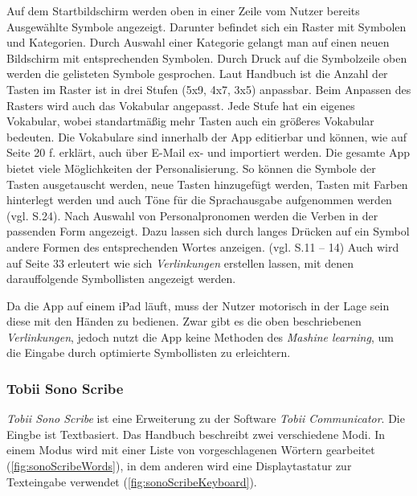             Auf dem Startbildschirm werden oben in einer Zeile vom Nutzer bereits Ausgewählte Symbole angezeigt. Darunter befindet sich ein Raster mit Symbolen und Kategorien. Durch Auswahl einer Kategorie gelangt man auf einen neuen Bildschirm mit entsprechenden Symbolen.
            Durch Druck auf die Symbolzeile oben werden die gelisteten Symbole gesprochen. 
            Laut Handbuch \parencite[S. 7 ff]{cidar:metaTalkManual} ist die Anzahl der Tasten im Raster ist in drei Stufen (5x9, 4x7, 3x5) anpassbar. Beim Anpassen des Rasters wird auch das Vokabular angepasst. Jede Stufe hat ein eigenes Vokabular, wobei standartmäßig mehr Tasten auch ein größeres Vokabular bedeuten. Die Vokabulare sind innerhalb der App editierbar und können, wie auf Seite 20 f. erklärt, auch über E-Mail ex- und importiert werden. Die gesamte App bietet viele Möglichkeiten der Personalisierung. So können die Symbole der Tasten ausgetauscht werden, neue Tasten hinzugefügt werden, Tasten mit Farben hinterlegt werden und auch Töne für die Sprachausgabe aufgenommen werden (vgl. S.24). Nach Auswahl von Personalpronomen werden die Verben in der passenden Form angezeigt. Dazu lassen sich durch langes Drücken auf ein Symbol andere Formen des entsprechenden Wortes anzeigen. (vgl. S.11 – 14) Auch wird auf Seite 33 erleutert wie sich \emph{Verlinkungen} erstellen lassen, mit denen darauffolgende Symbollisten angezeigt werden.
            
            Da die App auf einem iPad läuft, muss der Nutzer motorisch in der Lage sein diese mit den Händen zu bedienen. Zwar gibt es die oben beschriebenen \emph{Verlinkungen}, jedoch nutzt die App keine Methoden des \emph{Mashine learning}, um die Eingabe durch optimierte Symbollisten zu erleichtern.
            
        \subsubsection*{Tobii Sono Scribe}
        
        	\emph{Tobii Sono Scribe} ist eine Erweiterung zu der Software \emph{Tobii Communicator}. Die Eingbe ist Textbasiert. Das Handbuch \parencite[S. 8]{tobii:sonoScribeManual} beschreibt zwei verschiedene Modi. In einem Modus wird mit einer Liste von vorgeschlagenen Wörtern gearbeitet (\autoref{fig:sonoScribeWords}), in dem anderen wird eine Displaytastatur zur Texteingabe verwendet (\autoref{fig:sonoScribeKeyboard}).
            
